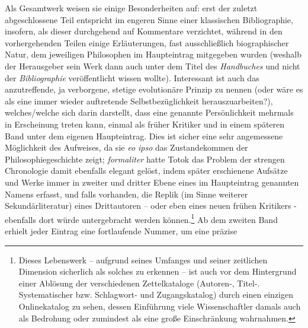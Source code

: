 \documentclass[a4paper,
fontsize=11pt,
oneside,
numbers=noperiodatend,
parskip=half-,
bibliography=totoc,
final
]{scrartcl}
\begin{document}
Als Gesamtwerk weisen sie einige Besonderheiten auf: erst der zuletzt
abgeschlossene Teil entspricht im engeren Sinne einer klassischen
Bibliographie, insofern, als dieser durchgehend auf Kommentare
verzichtet, während in den vorhergehenden Teilen einige Erläuterungen,
fast ausschließlich biographischer Natur, dem jeweiligen Philosophen im
Haupteintrag mitgegeben wurden (weshalb der Herausgeber sein Werk dann
auch unter dem Titel des \emph{Handbuches} und nicht der
\emph{Bibliographie} veröffentlicht wissen wollte). Interessant ist auch
das anzutreffende, ja verborgene, stetige evolutionäre Prinzip zu nennen
(oder wäre es als eine immer wieder auftretende Selbstbezüglichkeit
herauszuarbeiten?), welches/welche sich darin darstellt, dass eine
genannte Persönlichkeit mehrmals in Erscheinung treten kann, einmal als
früher Kritiker und in einem späteren Band unter dem eigenen
Haupteintrag. Dies ist sicher eine sehr angemessene Möglichkeit des
Aufweises, da sie \emph{eo ipso} das Zustandekommen der
Philosophiegeschichte zeigt; \emph{formaliter} hatte Totok das Problem
der strengen Chronologie damit ebenfalls elegant gelöst, indem später
erschienene Aufsätze und Werke immer in zweiter und dritter Ebene eines
im Haupteintrag genannten Namens erfasst, und falls vorhanden, die
Replik (im Sinne weiterer Sekundärliteratur) eines Drittautoren -- oder
eben eines neuen frühen Kritikers - ebenfalls dort würde untergebracht
werden können.\footnote{Dieses Lebenswerk -- aufgrund seines Umfanges
  und seiner zeitlichen Dimension sicherlich als solches zu erkennen --
  ist auch vor dem Hintergrund einer Ablösung der verschiedenen
  Zettelkataloge (Autoren-, Titel-. Systematischer bzw. Schlagwort- und
  Zugangskatalog) durch einen einzigen Onlinekatalog zu sehen, dessen
  Einführung viele Wissenschaftler damals auch als Bedrohung oder
  zumindest als eine große Einschränkung wahrnahmen.} Ab dem zweiten
Band erhielt jeder Eintrag eine fortlaufende Nummer, um eine präzise
\end{document}
